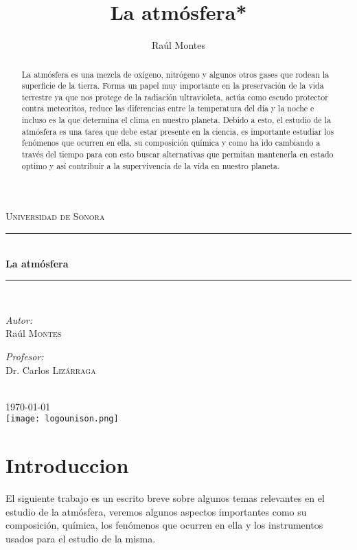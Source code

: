 \documentclass[11pt]{article}
\title{La atmósfera*}
\author{Raúl Montes}
\begin{document}
\begin{titlepage}
\newcommand{\HRule}{\rule{\linewidth}{0.5mm}}
\center
\textsc{\LARGE Universidad de Sonora}\\[1.5cm]
\HRule \\[0.4cm]
{ \huge \bfseries La atmósfera}\\[0.4cm] 
\HRule \\[1.1cm]
\begin{minipage}{0.4\textwidth}
\begin{flushleft} \large
\emph{Autor:}\\
Raúl \textsc{Montes} 
\end{flushleft}
\end{minipage}
\begin{minipage}{0.4\textwidth}
\begin{flushright} \large
\emph{Profesor:} \\
Dr. Carlos \textsc{Lizárraga} 
\end{flushright}
\end{minipage}\\[1.5cm]
{\large \today}\\[2cm] 
\texttt{[image: logounison.png]}\\[1cm] 
\end{titlepage}

\renewcommand{\abstractname}{Resumen}
\begin{abstract}
La atmósfera es una mezcla de oxígeno, nitrógeno y algunos otros gases que rodean la superficie de la tierra. Forma un papel muy importante en la preservación de la vida terrestre ya que nos protege de la radiación ultravioleta, actúa como escudo protector contra meteoritos, reduce las diferencias entre la temperatura del día y la noche e incluso es la que determina el clima en nuestro planeta. Debido a esto, el estudio de la atmósfera es una tarea que debe estar presente en la ciencia, es importante estudiar los fenómenos que ocurren en ella, su composición química y como ha ido cambiando a través del tiempo para con esto buscar alternativas que permitan mantenerla en estado optimo y así contribuir a la supervivencia de la vida en nuestro planeta.
\end{abstract}
\section*{Introduccion}
El siguiente trabajo es un escrito breve sobre algunos temas relevantes en el estudio de la atmósfera, veremos algunos aspectos importantes como su composición, química, los fenómenos que ocurren en ella y los instrumentos usados para el estudio de la misma.
\end{document}

